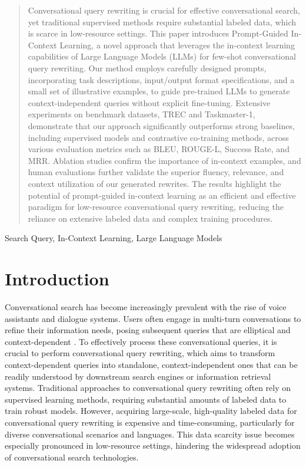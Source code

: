 \begin{abstract}
Conversational query rewriting is crucial for effective conversational search, yet traditional supervised methods require substantial labeled data, which is scarce in low-resource settings.  This paper introduces Prompt-Guided In-Context Learning, a novel approach that leverages the in-context learning capabilities of Large Language Models (LLMs) for few-shot conversational query rewriting.  Our method employs carefully designed prompts, incorporating task descriptions, input/output format specifications, and a small set of illustrative examples, to guide pre-trained LLMs to generate context-independent queries without explicit fine-tuning.  Extensive experiments on benchmark datasets, TREC and Taskmaster-1, demonstrate that our approach significantly outperforms strong baselines, including supervised models and contrastive co-training methods, across various evaluation metrics such as BLEU, ROUGE-L, Success Rate, and MRR.  Ablation studies confirm the importance of in-context examples, and human evaluations further validate the superior fluency, relevance, and context utilization of our generated rewrites.  The results highlight the potential of prompt-guided in-context learning as an efficient and effective paradigm for low-resource conversational query rewriting, reducing the reliance on extensive labeled data and complex training procedures.
\end{abstract}

\begin{IEEEkeywords}
Search Query, In-Context Learning, Large Language Models
\end{IEEEkeywords}

\section{Introduction}
Conversational search has become increasingly prevalent with the rise of voice assistants and dialogue systems. Users often engage in multi-turn conversations to refine their information needs, posing subsequent queries that are elliptical and context-dependent \cite{SurveyConvSearch2024}. To effectively process these conversational queries, it is crucial to perform conversational query rewriting, which aims to transform context-dependent queries into standalone, context-independent ones that can be readily understood by downstream search engines or information retrieval systems. Traditional approaches to conversational query rewriting often rely on supervised learning methods, requiring substantial amounts of labeled data to train robust models. However, acquiring large-scale, high-quality labeled data for conversational query rewriting is expensive and time-consuming, particularly for diverse conversational scenarios and languages. This data scarcity issue becomes especially pronounced in low-resource settings, hindering the widespread adoption of conversational search technologies.

